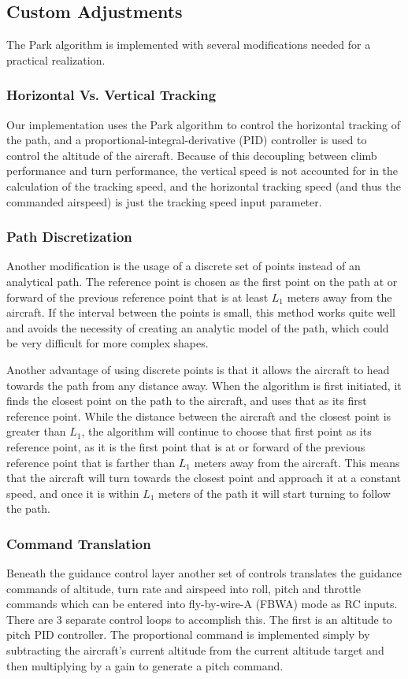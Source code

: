 \documentclass{aiaa}
\begin{document}
\subsection{Custom Adjustments}
The Park algorithm is implemented with several modifications needed for a practical realization.

\subsubsection{Horizontal Vs. Vertical Tracking}
 Our implementation uses the Park algorithm to control the horizontal tracking of the path, and a proportional-integral-derivative (PID) controller is used to control the altitude of the aircraft. Because of this decoupling between climb performance and turn performance, the vertical speed is not accounted for in the calculation of the tracking speed, and the horizontal tracking speed (and thus the commanded airspeed) is just the tracking speed input parameter.

\subsubsection{Path Discretization}
Another modification is the usage of a discrete set of points instead of an analytical path. The reference point is chosen as the first point on the path at or forward of the previous reference point that is at least $L_1$ meters away from the aircraft. If the interval between the points is small, this method works quite well and avoids the necessity of creating an analytic model of the path, which could be very difficult for more complex shapes. 

Another advantage of using discrete points is that it allows the aircraft to head towards the path from any distance away. When the algorithm is first initiated, it finds the closest point on the path to the aircraft, and uses that as its first reference point. While the distance between the aircraft and the closest point is greater than $L_1$, the algorithm will continue to choose that first point as its reference point, as it is the first point that is at or forward of the previous reference point that is farther than $L_1$ meters away from the aircraft. 
This means that the aircraft will turn towards the closest point and approach it at a constant speed, and once it is within $L_1$ meters of the path it will start turning to follow the path. 

\subsubsection{Command Translation}
Beneath the guidance control layer another set of controls translates the guidance commands of altitude, turn rate and airspeed into roll, pitch and throttle commands which can be entered into fly-by-wire-A (FBWA) mode as RC inputs. There are 3 separate control loops to accomplish this. The first is an altitude to pitch PID controller. The proportional command is implemented simply by subtracting the aircraft's current altitude from the current altitude target and then multiplying by a gain to generate a pitch command. 
\end{document}

